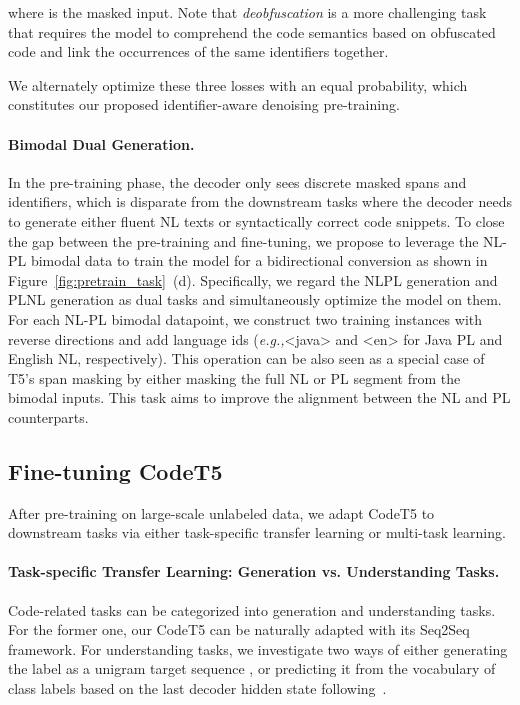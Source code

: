 \documentclass[11pt]{article}
\newcommand{\eg}{{\em e.g.,}\xspace}
\begin{document}
\noindent where  is the masked input. Note that \emph{deobfuscation} is a more challenging task that requires the model to comprehend the code semantics based on obfuscated code and link the occurrences of the same identifiers together.

We alternately optimize these three losses with an equal probability, which constitutes our proposed identifier-aware  denoising  pre-training.

\paragraph{Bimodal Dual Generation.}
In the  pre-training phase, the decoder only sees  discrete masked spans and identifiers, which is disparate from the downstream tasks where the decoder needs to generate either fluent NL texts or syntactically correct code snippets. To close the gap between the pre-training and fine-tuning, we propose to leverage the NL-PL bimodal data to train the model for a bidirectional conversion as shown in Figure~\ref{fig:pretrain_task}~(d).
Specifically, we regard the NLPL generation and   PLNL generation as  dual tasks and  simultaneously optimize the model on them.
For each NL-PL bimodal datapoint, we construct two training instances with reverse directions and add language ids (\eg <java> and <en> for Java PL and English NL, respectively). This operation can be also seen as a special case of T5's span masking by either masking the full NL or PL segment from the bimodal inputs. 
This task aims to improve the alignment between the NL and PL counterparts.


\subsection{Fine-tuning CodeT5} \label{model:finetune}
After pre-training on large-scale unlabeled data, we adapt CodeT5 to downstream tasks via either task-specific transfer learning or multi-task learning.

\paragraph{Task-specific Transfer Learning: Generation vs. Understanding Tasks.} Code-related tasks can be categorized into generation and understanding tasks. For the former one, our CodeT5 can  be naturally adapted with its Seq2Seq framework. 
For understanding tasks, we investigate two ways of either generating the label as a unigram target sequence \cite{DBLP:journals/jmlr/RaffelSRLNMZLL20}, or predicting it from the vocabulary of class labels based on the last decoder hidden state following~\citet{DBLP:conf/acl/LewisLGGMLSZ20}.
\end{document}
